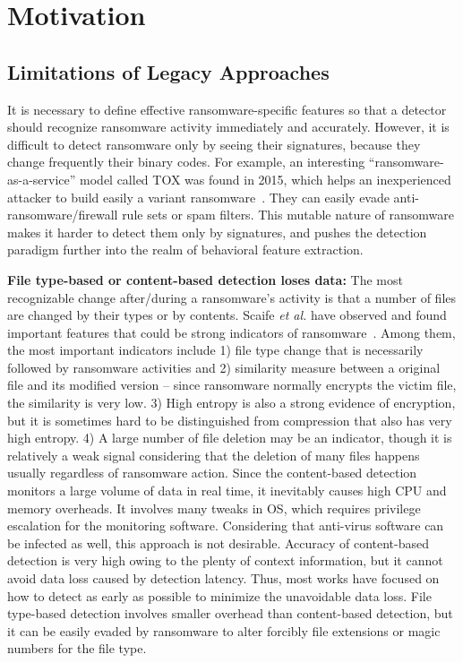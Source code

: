 \documentclass[conference]{IEEEtran}
\newcommand{\etal}{{\it et al.}\xspace}
\begin{document}
\section{Motivation}

\subsection{Limitations of Legacy Approaches}

It is necessary to define effective ransomware-specific features so
that a detector should recognize ransomware activity immediately
and accurately.  However, it is difficult to detect ransomware only
by seeing their signatures, because they change frequently their
binary codes.  For example,  an interesting
``ransomware-as-a-service'' model called TOX was found in 2015,
which helps an inexperienced attacker to build easily a variant
ransomware~\cite{walter15}.  They can easily evade
anti-ransomware/firewall rule sets or spam filters.  This mutable
nature of ransomware makes it harder to detect them only by
signatures, and pushes the detection paradigm further into the
realm of behavioral feature extraction.

{\bf File type-based or content-based detection loses data:} 
The most recognizable change after/during a ransomware's activity
is that a number of files are changed by their types or by
contents.  Scaife \etal have observed and found important features
that could be strong indicators of ransomware~\cite{scaife16}.
Among them, the most important indicators include 1) file type
change that is necessarily followed by ransomware activities and 2)
similarity measure between a original file and its modified version
-- since ransomware normally encrypts the victim file, the
similarity is very low.  3) High entropy is also a strong evidence
of encryption, but it is sometimes hard to be distinguished from
compression that also has very high entropy. 4) A large number of
file deletion may be an indicator, though it is relatively a weak
signal considering that the deletion of many files happens usually
regardless of ransomware action.  Since the content-based detection
monitors a large volume of data in real time, it inevitably causes
high CPU and memory overheads.  It involves many tweaks in OS,
which requires privilege escalation for the monitoring software.
Considering that anti-virus software can be infected as well, this
approach is not desirable.  Accuracy of content-based detection is
very high owing to the plenty of context information, but it cannot
avoid data loss caused by detection latency. Thus, most works have
focused on how to detect as early as possible to minimize the
unavoidable data loss.  File type-based detection involves smaller
overhead than content-based detection, but it can be easily evaded
by ransomware to alter forcibly file extensions or magic numbers
for the file type.
\end{document}

